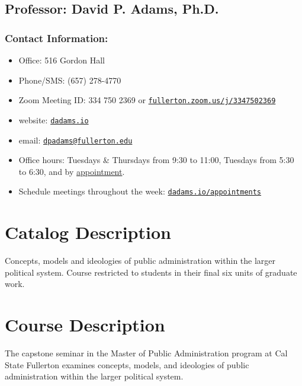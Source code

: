 \documentclass[12pt, letterpaper]{article}
\begin{document}
                    \subsection*{Professor: David P. Adams, Ph.D.}

                    \subsubsection*{Contact Information:}
                    
                    \begin{itemize}
                            \item Office: 516 Gordon Hall
                            \item Phone/SMS: (657) 278-4770
                            \item Zoom Meeting ID: 334 750 2369 or \href{https://fullerton.zoom.us/j/3347502369}{\texttt{fullerton.zoom.us/j/3347502369}} 
                            \item website: \href{https://dadams.io}{\texttt{dadams.io}}
                            \item email: \href{dpadams@fullerton.edu}{\texttt{dpadams@fullerton.edu}}
                            \item Office hours: Tuesdays \& Thursdays from 9:30 to 11:00, Tuesdays from 5:30 to 6:30, and by \href{https://dadams.io/appointments}{appointment}.
                            \item Schedule meetings throughout the week: \href{https://dadams.io/appointments}{\texttt{dadams.io/appointments}}
                    \end{itemize}
                    
                    \section{Catalog Description}
                    Concepts, models and ideologies of public administration within the larger political system. Course restricted to students in their final six units of graduate work.
                    
                    \section{Course Description}
                    The capstone seminar in the Master of Public Administration program at Cal State Fullerton examines concepts, models, and ideologies of public administration within the larger political system.
\end{document}
